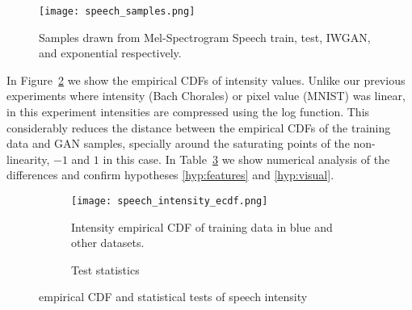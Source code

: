 \begin{figure}[!h]
  \begin{center}
  \texttt{[image: speech\_samples.png]}
  \caption{Samples drawn from Mel-Spectrogram Speech train, test,
IWGAN, and exponential respectively.}
  \label{fig:speech_samples}
  \end{center}
\end{figure}

In Figure~\ref{fig:speech_intensity_ecdf} we show the empirical CDFs of intensity
values. Unlike our previous experiments where intensity (Bach Chorales)
or pixel value (MNIST) was linear, in this experiment intensities are compressed using the
log function. This considerably reduces the distance between the empirical CDFs
of the training data and GAN samples,
specially around the saturating points of the non-linearity, $-1$ and $1$ in this
case. In Table~\ref{tbl:speech_intensity} we show numerical analysis of the
differences and confirm hypotheses \ref{hyp:features} and \ref{hyp:visual}.
\begin{figure}[!h]
    \begin{subfigure}[b]{0.65\textwidth}
        \texttt{[image: speech\_intensity\_ecdf.png]}
        \caption{Intensity empirical CDF of training data in blue
        and other datasets.}
        \label{fig:speech_intensity_ecdf}
    \end{subfigure}
    \quad
    \begin{subfigure}[b]{0.3\textwidth}
        \caption{Test statistics}
        \label{tbl:speech_intensity}
    \end{subfigure}
    \caption{empirical CDF and statistical tests of speech intensity}
    \label{fig:speech_intensity}
\end{figure}

